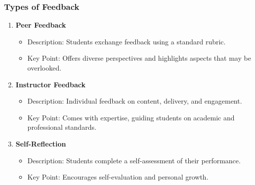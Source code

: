 \documentclass[aspectratio=169]{beamer}
\begin{document}
\begin{frame}[fragile]
  \frametitle{Types of Feedback}
  \begin{enumerate}
    \item \textbf{Peer Feedback}
      \begin{itemize}
        \item Description: Students exchange feedback using a standard rubric.
        \item Key Point: Offers diverse perspectives and highlights aspects that may be overlooked.
      \end{itemize}
    
    \item \textbf{Instructor Feedback}
      \begin{itemize}
        \item Description: Individual feedback on content, delivery, and engagement.
        \item Key Point: Comes with expertise, guiding students on academic and professional standards.
      \end{itemize}
    
    \item \textbf{Self-Reflection}
      \begin{itemize}
        \item Description: Students complete a self-assessment of their performance.
        \item Key Point: Encourages self-evaluation and personal growth.
      \end{itemize}
  \end{enumerate}
\end{frame}
\end{document}

